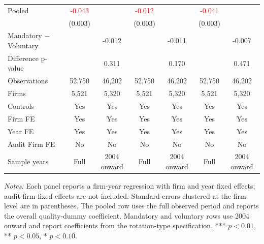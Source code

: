 \begin{table}[htbp]
\begin{threeparttable}
{\begin{tabular}{l cc cc cc}
Pooled & \textcolor{red}{-0.043\sym{***}} &  & \textcolor{red}{-0.012\sym{***}} &  & \textcolor{red}{-0.041\sym{***}} &  \\
 & (0.003) &  & (0.003) &  & (0.003) &  \\
Mandatory $-$ Voluntary &  & -0.012 &  & -0.011 &  & -0.007 \\
Difference p-value &  & 0.311 &  & 0.170 &  & 0.471 \\
Observations & 52,750 & 46,202 & 52,750 & 46,202 & 52,750 & 46,202 \\
Firms & 5,521 & 5,320 & 5,521 & 5,320 & 5,521 & 5,320 \\
\midrule
Controls & Yes & Yes & Yes & Yes & Yes & Yes \\
Firm FE & Yes & Yes & Yes & Yes & Yes & Yes \\
Year FE & Yes & Yes & Yes & Yes & Yes & Yes \\
Audit Firm FE & No & No & No & No & No & No \\
Sample years & Full & 2004 onward & Full & 2004 onward & Full & 2004 onward \\
\bottomrule
\end{tabular}}
\begin{tablenotes}\footnotesize
\item \textit{Notes:} Each panel reports a firm-year regression with firm and year fixed effects; audit-firm fixed effects are not included. Standard errors clustered at the firm level are in parentheses. The pooled row uses the full observed period and reports the overall quality-dummy coefficient. Mandatory and voluntary rows use 2004 onward and report coefficients from the rotation-type specification. *** \(p<0.01\), ** \(p<0.05\), * \(p<0.10\).
\end{tablenotes}
\end{threeparttable}
\end{table}
